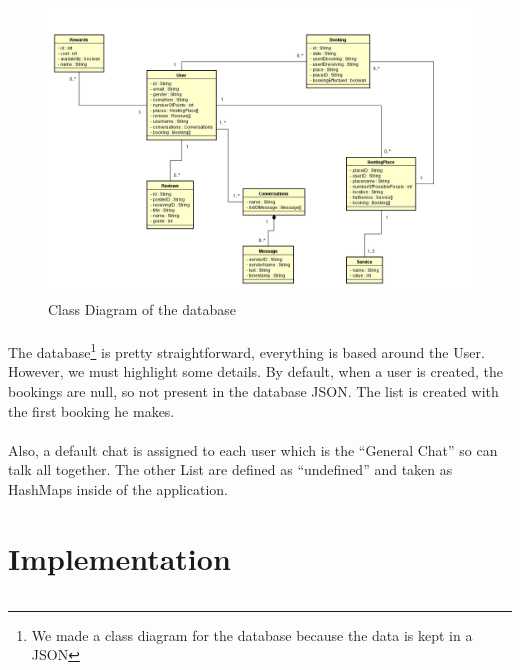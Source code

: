 \documentclass[paper=a4, fontsize=12pt,DIV=14]{scrartcl}    %
\begin{document}
					\begin{figure}[!htbp]
						\center
	                    \includegraphics[scale=0.6]{img/class_diagram.png}
	                    \caption{Class Diagram of the database } 
					\end{figure}

				\paragraph{}The database\footnote{We made a class diagram for the database because the data is kept in a JSON} is pretty straightforward, everything is based around the User. However, we must highlight some details. By default, when a user is created, the bookings are null, so not present in the database JSON. The list is created with the first booking he makes.
				\paragraph{}Also, a default chat is assigned to each user which is the “General Chat” so can talk all together. The other List are defined as “undefined” and taken as HashMaps inside of the application.

    \newpage
        \section{Implementation}
        	\begin{lstlisting}

        	\end{lstlisting}
\end{document}
